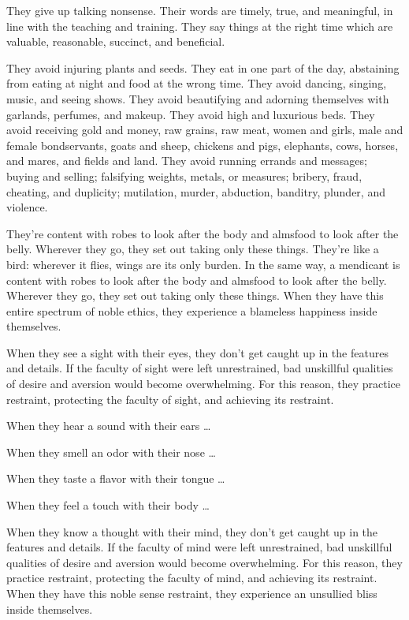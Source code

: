 \documentclass[12pt,openany]{book}%
\begin{document}
They give up talking nonsense. Their words are timely, true, and meaningful, in line with the teaching and training. They say things at the right time which are valuable, reasonable, succinct, and beneficial. 

They avoid injuring plants and seeds. They eat in one part of the day, abstaining from eating at night and food at the wrong time. They avoid dancing, singing, music, and seeing shows. They avoid beautifying and adorning themselves with garlands, perfumes, and makeup. They avoid high and luxurious beds. They avoid receiving gold and money, raw grains, raw meat, women and girls, male and female bondservants, goats and sheep, chickens and pigs, elephants, cows, horses, and mares, and fields and land. They avoid running errands and messages; buying and selling; falsifying weights, metals, or measures; bribery, fraud, cheating, and duplicity; mutilation, murder, abduction, banditry, plunder, and violence. 

They’re content with robes to look after the body and almsfood to look after the belly. Wherever they go, they set out taking only these things. They’re like a bird: wherever it flies, wings are its only burden. In the same way, a mendicant is content with robes to look after the body and almsfood to look after the belly. Wherever they go, they set out taking only these things. When they have this entire spectrum of noble ethics, they experience a blameless happiness inside themselves. 

When they see a sight with their eyes, they don’t get caught up in the features and details. If the faculty of sight were left unrestrained, bad unskillful qualities of desire and aversion would become overwhelming. For this reason, they practice restraint, protecting the faculty of sight, and achieving its restraint. 

When they hear a sound with their ears … 

When they smell an odor with their nose … 

When they taste a flavor with their tongue … 

When they feel a touch with their body … 

When they know a thought with their mind, they don’t get caught up in the features and details. If the faculty of mind were left unrestrained, bad unskillful qualities of desire and aversion would become overwhelming. For this reason, they practice restraint, protecting the faculty of mind, and achieving its restraint. When they have this noble sense restraint, they experience an unsullied bliss inside themselves. 
\end{document}
